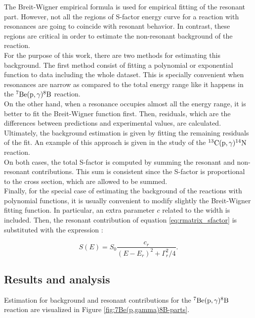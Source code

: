\documentclass[openany]{book}
\begin{document}
The Breit-Wigner empirical formula is used for empirical fitting of the resonant part. However, not all the regions of S-factor energy curve for a reaction with resonances are going to coincide with resonant behavior. In contrast, these regions are critical in order to estimate the non-resonant background of the reaction.\\

For the purpose of this work, there are two methods for estimating this background. The first method consist of fitting a polynomial or exponential function to data including the whole dataset. This is specially convenient when resonances are narrow as compared to the total energy range like it happens in the $\mathrm{{}^{7}Be(p, \gamma){}^{8}B}$ reaction.  \\

On the other hand, when a resonance occupies almost all the energy range, it is better to fit the Breit-Wigner function first. Then, residuals, which are the differences between predictions and experimental values, are calculated. Ultimately, the background estimation is given by fitting the remaining residuals of the fit. An example of this approach is given in the study of the $\mathrm{{}^{13}C(p, \gamma){}^{14}N}$ reaction. \\

On both cases, the total S-factor is computed by summing the resonant and non-resonant contributions. This sum is consistent since the S-factor is proportional to the cross section, which are allowed to be summed. \\

Finally, for the special case of estimating the background of the reactions with polynomial functions, it is usually convenient to modify slightly the Breit-Wigner fitting function. In particular, an extra parameter $c$ related to the width is included. Then, the resonant contribution of equation \ref{eq:rmatrix_sfactor} is substituted with the expression \cite{sparta_pizzone_bertulani_hou_lamia_tumino_2020}:

\begin{equation}\label{eq:rmatrix_sfactor_modified}
	S(E) = S_0 \frac{c_r}{(E - E_r)^2 + \Gamma_r^2/4}. 
\end{equation}

\subsection{Results and analysis} \label{sub:resultsAnalysisResonant}

Estimation for background and resonant contributions for the $\mathrm{{}^{7}Be(p, \gamma){}^{8}B}$ reaction are visualized in Figure \ref{fig:7Be(p,gamma)8B-parts}. \\
\end{document}
